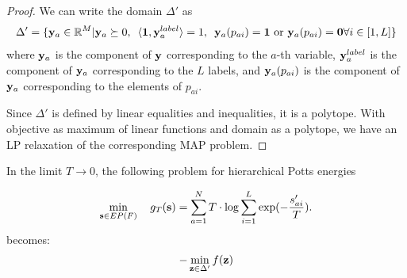 {{\begin{proof}
    We can write the domain $\Delta'$ as 
    \begin{equation}
    \Delta' = \{ {\bf y}_a \in \mathbb{R}^M | {\bf y}_a \succeq 0, \enskip \langle {\bf 1}, {\bf y}_a^{label} \rangle = 1, \enskip {\bf y}_a(p_{ai}) = {\bf 1} \textrm{ or } {\bf y}_a(p_{ai}) = {\bf 0} \forall i \in [1, L]\}
    \end{equation} 
where ${\bf y}_a$ is the component of $\bf y$ corresponding to the $a$-th variable, ${\bf y}_a^{label}$  is the component of ${\bf y}_a$ corresponding to the $L$ labels, and ${\bf y}_a(p_{ai})$ is the component of ${\bf y}_a$ corresponding to the elements of $p_{ai}$. 

    Since $\Delta'$ is defined by linear equalities and inequalities, it is a polytope. With objective as maximum of linear functions and domain as a polytope, we have an LP relaxation of the corresponding MAP problem.
\end{proof}


{\proposition In the limit $T \to 0$, the following problem for hierarchical Potts energies 

\begin{equation}
\min_{{\bf s} \in EP(F)} \quad g_T ({\bf s}) = \sum_{a = 1}^{N} T \cdot \log \sum_{i = 1}^L \exp(-\frac{s'_{ai}}{T}).
\end{equation}
becomes:
\begin{align}
    - \min_{{\bf z} \in \Delta'} f({\bf z}) 
\end{align}

}}}
